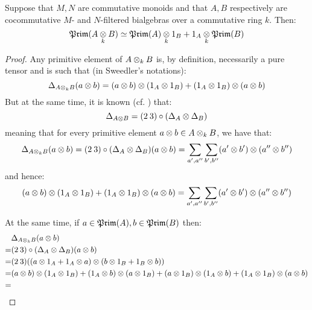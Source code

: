         \begin{lemma} \label{lemma: primitive_elements_in_tensor_products_of_filtered_algebras}
            Suppose that $M, N$ are commutative monoids and that $A, B$ respectively are cocommutative $M$- and $N$-filtered bialgebras over a commutative ring $k$. Then:
                $$\Prim(A \tensor_k B) \cong \Prim(A) \tensor_k 1_B + 1_A \tensor_k \Prim(B)$$
        \end{lemma}
            \begin{proof}
                Any primitive element of $A \tensor_k B$ is, by definition, necessarily a pure tensor and is such that (in Sweedler's notations):
                    $$\Delta_{A \tensor_k B}(a \tensor b) = (a \tensor b) \tensor (1_A \tensor 1_B) + (1_A \tensor 1_B) \tensor (a \tensor b)$$
                But at the same time, it is known (cf. \cite[Chapter III]{kassel_quantum_groups}) that:
                    $$\Delta_{A \tensor B} = (2 \: 3) \circ ( \Delta_A \tensor \Delta_B )$$
                meaning that for every primitive element $a \tensor b \in A \tensor_k B$, we have that:
                    $$\Delta_{A \tensor_k B}(a \tensor b) = (2 \: 3) \circ ( \Delta_A \tensor \Delta_B )(a \tensor b) = \sum_{a', a''} \sum_{b', b''} (a' \tensor b') \tensor (a'' \tensor b'')$$
                and hence:
                    $$(a \tensor b) \tensor (1_A \tensor 1_B) + (1_A \tensor 1_B) \tensor (a \tensor b) = \sum_{a', a''} \sum_{b', b''} (a' \tensor b') \tensor (a'' \tensor b'')$$

                At the same time, if $a \in \mathfrak{Prim}(A), b \in \mathfrak{Prim}(B)$ then:
                    $$
                        \begin{aligned}
                            & \Delta_{A \tensor_k B}(a \tensor b)
                            \\
                            = & (2 \: 3) \circ ( \Delta_A \tensor \Delta_B )(a \tensor b)
                            \\
                            = & (2 \: 3) ( (a \tensor 1_A + 1_A \tensor a) \tensor (b \tensor 1_B + 1_B \tensor b) )
                            \\
                            = & (a \tensor b) \tensor (1_A \tensor 1_B) + (1_A \tensor b) \tensor (a \tensor 1_B) + (a \tensor 1_B) \tensor (1_A \tensor b) + (1_A \tensor 1_B) \tensor (a \tensor b)
                            \\
                            = & 
                        \end{aligned}
                    $$
            \end{proof}

